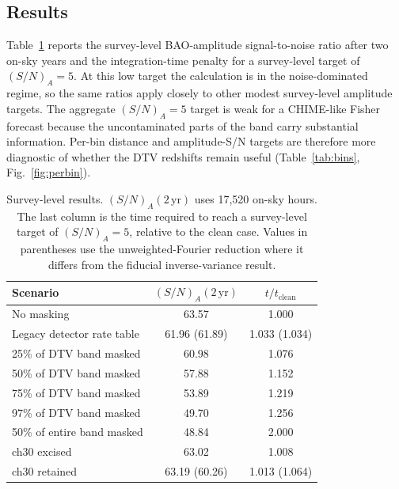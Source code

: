 \subsection{Results}
\label{sec:results}

Table~\ref{tab:survey} reports the survey-level BAO-amplitude
signal-to-noise ratio after two on-sky years and the integration-time
penalty for a survey-level target of $(S/N)_A=5$. At this low target
the calculation is in the noise-dominated regime, so the same ratios
apply closely to other modest survey-level amplitude targets. The
aggregate $(S/N)_A=5$ target is weak for a CHIME-like Fisher forecast
because the uncontaminated parts of the band carry substantial
information. Per-bin distance and amplitude-S/N targets are therefore
more diagnostic of whether the DTV redshifts remain useful
(Table~\ref{tab:bins}, Fig.~\ref{fig:perbin}).

\begin{table}[t]
\centering
\caption{Survey-level results. $(S/N)_A(2\,\mathrm{yr})$ uses 17,520
on-sky hours. The last column is the time required to reach a
survey-level target of $(S/N)_A=5$, relative to the clean case. Values
in parentheses use the unweighted-Fourier reduction where it differs
from the fiducial inverse-variance result.}
\label{tab:survey}
\small
\setlength{\tabcolsep}{4pt}
\begin{tabular}{lcc}
\toprule
Scenario & $(S/N)_A(2\,\mathrm{yr})$ & $t/t_\mathrm{clean}$ \\
\midrule
No masking & 63.57 & 1.000 \\
Legacy detector rate table & 61.96 (61.89) & 1.033 (1.034) \\
25\% of DTV band masked & 60.98 & 1.076 \\
50\% of DTV band masked & 57.88 & 1.152 \\
75\% of DTV band masked & 53.89 & 1.219 \\
97\% of DTV band masked & 49.70 & 1.256 \\
50\% of entire band masked & 48.84 & 2.000 \\
ch30 excised & 63.02 & 1.008 \\
ch30 retained & 63.19 (60.26) & 1.013 (1.064) \\
\bottomrule
\end{tabular}
\end{table}

